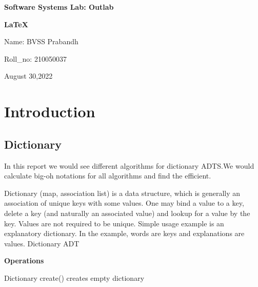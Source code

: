 \documentclass{report}
\begin{document}
\begin{titlepage}
\begin{center} 

\vspace*{6.85cm}

{\bfseries \huge Software Systems Lab: Outlab}

\vspace{1cm}

{\bfseries \huge \LaTeX}

\vspace{1cm}

{\Large Name: BVSS Prabandh}

\vspace{0cm}

{\Large Roll\_no: 210050037}

\vspace{1cm}

{\Large August 30,2022}
\end{center}
\end{titlepage}
\tableofcontents
\newpage
\chapter{\Large Introduction}
\section{\large Dictionary}
   
In this report we would see different algorithms for dictionary ADTS.We would calculate big-oh notations for all algorithms and find the efficient.

\vspace{1cm}

Dictionary\cite{1} (map, association list) is a data structure, which is generally an association of unique keys with some values. One may bind a value to a key, delete a key (and naturally an associated value) and lookup for a value by the key. Values are not required to be unique. Simple usage example is an explanatory dictionary. In the example, words are keys and explanations are values.
Dictionary ADT

\vspace{1cm}

\textbf{\large Operations}

\vspace{0.5cm}

    Dictionary create()
    creates empty dictionary
    
\vspace{1cm}
\end{document}
